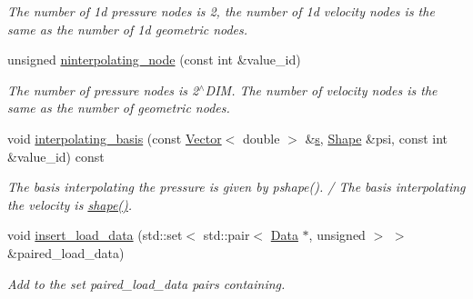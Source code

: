 \begin{DoxyCompactItemize}
\begin{DoxyCompactList}\small\item\em The number of 1d pressure nodes is 2, the number of 1d velocity nodes is the same as the number of 1d geometric nodes. \end{DoxyCompactList}\item 
unsigned \hyperlink{classoomph_1_1RefineablePolarTaylorHoodElement_a999bb0fb10a4ebdc446e99bddaf7cdd2}{ninterpolating\+\_\+node} (const int \&value\+\_\+id)
\begin{DoxyCompactList}\small\item\em The number of pressure nodes is 2$^\wedge$\+D\+IM. The number of velocity nodes is the same as the number of geometric nodes. \end{DoxyCompactList}\item 
void \hyperlink{classoomph_1_1RefineablePolarTaylorHoodElement_a6add07917cd3a45ca02e3682ef6299c2}{interpolating\+\_\+basis} (const \hyperlink{classoomph_1_1Vector}{Vector}$<$ double $>$ \&\hyperlink{cfortran_8h_ab7123126e4885ef647dd9c6e3807a21c}{s}, \hyperlink{classoomph_1_1Shape}{Shape} \&psi, const int \&value\+\_\+id) const
\begin{DoxyCompactList}\small\item\em The basis interpolating the pressure is given by pshape(). / The basis interpolating the velocity is \hyperlink{classoomph_1_1FiniteElement_a58a25b6859ddd43b7bfe64a19fee5023}{shape()}. \end{DoxyCompactList}\item 
void \hyperlink{classoomph_1_1RefineablePolarTaylorHoodElement_a2bff6e8e6d498f62592c3d6775565585}{insert\+\_\+load\+\_\+data} (std\+::set$<$ std\+::pair$<$ \hyperlink{classoomph_1_1Data}{Data} $\ast$, unsigned $>$ $>$ \&paired\+\_\+load\+\_\+data)
\begin{DoxyCompactList}\small\item\em Add to the set {\ttfamily paired\+\_\+load\+\_\+data} pairs containing. \end{DoxyCompactList}\end{DoxyCompactItemize}
